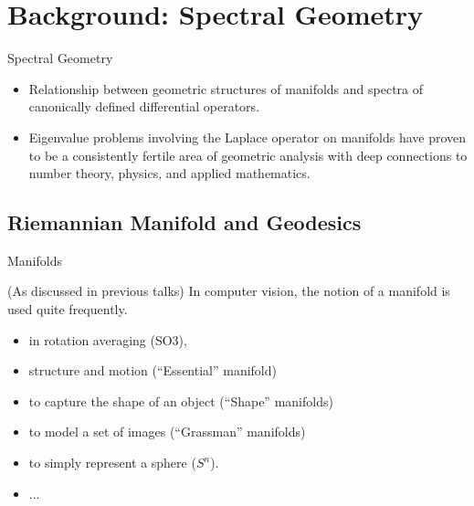 \documentclass{beamer}
\begin{document}
\section{Background: Spectral Geometry}


\begin{frame}{Spectral Geometry}

\begin{itemize}
  \item Relationship between geometric structures of manifolds and spectra of canonically defined differential operators.
  \item Eigenvalue problems involving the Laplace operator on manifolds have proven to be a consistently fertile area of geometric analysis with deep connections to number theory, physics, and applied mathematics. 
\end{itemize}

\end{frame}

\subsection{Riemannian Manifold and Geodesics}

\begin{frame}{Manifolds}

(As discussed in previous talks) In computer vision, the notion of a manifold is used quite frequently.

\begin{itemize}
  \item in rotation averaging (SO3),
  \item structure and motion (“Essential” manifold)
  \item to capture the shape of an object (“Shape” manifolds)
  \item to model a set of images (“Grassman” manifolds)
  \item to simply represent a sphere ($S^n$).
  \item ...
\end{itemize}

\end{frame}
\end{document}
